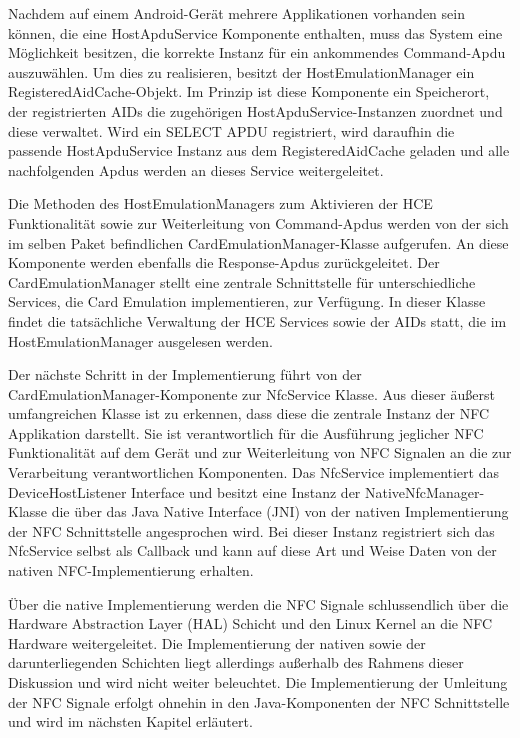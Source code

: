 Nachdem auf einem Android-Gerät mehrere Applikationen vorhanden sein können, die eine HostApduService Komponente enthalten, muss das System eine Möglichkeit besitzen, die korrekte Instanz für ein ankommendes Command-Apdu auszuwählen. Um dies zu realisieren, besitzt der HostEmulationManager ein RegisteredAidCache-Objekt. Im Prinzip ist diese Komponente ein Speicherort, der registrierten AIDs die zugehörigen HostApduService-Instanzen zuordnet und diese verwaltet. Wird ein SELECT APDU registriert, wird daraufhin die passende HostApduService Instanz aus dem RegisteredAidCache geladen und alle nachfolgenden Apdus werden an dieses Service weitergeleitet.

Die Methoden des HostEmulationManagers zum Aktivieren der HCE Funktionalität sowie zur Weiterleitung von Command-Apdus werden von der sich im selben Paket befindlichen CardEmulationManager-Klasse aufgerufen. An diese Komponente werden ebenfalls die Response-Apdus zurückgeleitet. Der CardEmulationManager stellt eine zentrale Schnittstelle für unterschiedliche Services, die Card Emulation implementieren, zur Verfügung. In dieser Klasse findet die tatsächliche Verwaltung der HCE Services sowie der AIDs statt, die im HostEmulationManager ausgelesen werden. 

Der nächste Schritt in der Implementierung führt von der CardEmulationManager-Komponente zur NfcService Klasse. Aus dieser äußerst umfangreichen Klasse ist zu erkennen, dass diese die zentrale Instanz der NFC Applikation darstellt. Sie ist verantwortlich für die Ausführung jeglicher NFC Funktionalität auf dem Gerät und zur Weiterleitung von NFC Signalen an die zur Verarbeitung verantwortlichen Komponenten. Das NfcService implementiert das DeviceHostListener Interface und besitzt eine Instanz der NativeNfcManager-Klasse die über das Java Native Interface (JNI) von der nativen Implementierung der NFC Schnittstelle angesprochen wird. Bei dieser Instanz registriert sich das NfcService selbst als Callback und kann auf diese Art und Weise Daten von der nativen NFC-Implementierung erhalten. 

Über die native Implementierung werden die NFC Signale schlussendlich über die Hardware Abstraction Layer (HAL) Schicht und den Linux Kernel an die NFC Hardware weitergeleitet. Die Implementierung der nativen sowie der darunterliegenden Schichten liegt allerdings außerhalb des Rahmens dieser Diskussion und wird nicht weiter beleuchtet.
Die Implementierung der Umleitung der NFC Signale erfolgt ohnehin in den Java-Komponenten der NFC Schnittstelle und wird im nächsten Kapitel erläutert. 


